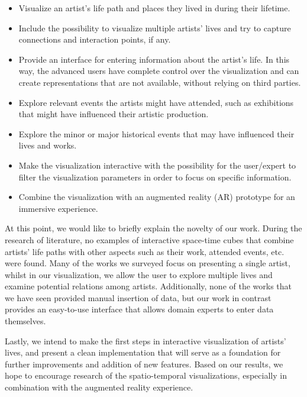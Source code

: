 \begin{itemize}
    \item Visualize an artist's life path and places they lived in during their lifetime.
    \item Include the possibility to visualize multiple artists' lives and try to capture connections and interaction points, if any.
    \item Provide an interface for entering information about the artist’s life. In this way, the advanced users have complete control over the
            visualization and can create representations that are not available, without relying on third parties.
    \item Explore relevant events the artists might have attended, such as exhibitions that might have influenced their artistic production.
    \item Explore the minor or major historical events that may have influenced their lives and works.
    \item Make the visualization interactive with the possibility for the user/expert to filter the visualization parameters in order to
            focus on specific information.
    \item Combine the visualization with an augmented reality (AR) prototype for an immersive experience.
\end{itemize}

At this point, we would like to briefly explain the novelty of our work. During the research of literature, no examples of interactive space-time cubes that
combine artists' life paths with other aspects such as their work, attended events, etc. were found. Many of the works we surveyed focus on presenting a
single artist, whilst in our visualization, we allow the user to explore multiple lives and examine potential relations among artists. Additionally, none
of the works that we have seen provided manual insertion of data, but our work in contrast provides an easy-to-use interface that allows domain experts to
enter data themselves.

Lastly, we intend to make the first steps in interactive visualization of artists' lives, and present a clean implementation that will serve as
a foundation for further improvements and addition of new features. Based on our results, we hope to encourage research of the spatio-temporal
visualizations, especially in combination with the augmented reality experience.
